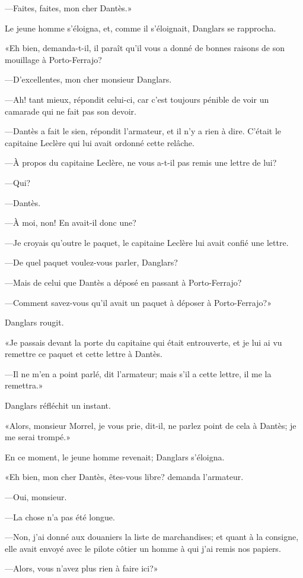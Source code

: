 —Faites, faites, mon cher Dantès.»

Le jeune homme s'éloigna, et, comme il s'éloignait, Danglars se rapprocha.

«Eh bien, demanda-t-il, il paraît qu'il vous a donné de bonnes raisons de son mouillage à Porto-Ferrajo?

—D'excellentes, mon cher monsieur Danglars.

—Ah! tant mieux, répondit celui-ci, car c'est toujours pénible de voir un camarade qui ne fait pas son devoir.

—Dantès a fait le sien, répondit l'armateur, et il n'y a rien à dire. C'était le capitaine Leclère qui lui avait ordonné cette relâche.

—À propos du capitaine Leclère, ne vous a-t-il pas remis une lettre de lui?

—Qui?

—Dantès.

—À moi, non! En avait-il donc une?

—Je croyais qu'outre le paquet, le capitaine Leclère lui avait confié une lettre.

—De quel paquet voulez-vous parler, Danglars?

—Mais de celui que Dantès a déposé en passant à Porto-Ferrajo?

—Comment savez-vous qu'il avait un paquet à déposer à Porto-Ferrajo?»

Danglars rougit.

«Je passais devant la porte du capitaine qui était entrouverte, et je lui ai vu remettre ce paquet et cette lettre à Dantès.

—Il ne m'en a point parlé, dit l'armateur; mais s'il a cette lettre, il me la remettra.»

Danglars réfléchit un instant.

«Alors, monsieur Morrel, je vous prie, dit-il, ne parlez point de cela à Dantès; je me serai trompé.»

En ce moment, le jeune homme revenait; Danglars s'éloigna.

«Eh bien, mon cher Dantès, êtes-vous libre? demanda l'armateur.

—Oui, monsieur.

—La chose n'a pas été longue.

—Non, j'ai donné aux douaniers la liste de marchandises; et quant à la consigne, elle avait envoyé avec le pilote côtier un homme à qui j'ai remis nos papiers.

—Alors, vous n'avez plus rien à faire ici?»

